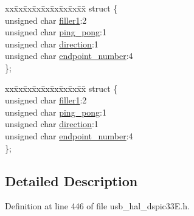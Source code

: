 \begin{DoxyCompactItemize}
\begin{tabbing}
\end{tabbing}\item 
\begin{tabbing}
xx\=xx\=xx\=xx\=xx\=xx\=xx\=xx\=xx\=\kill
struct \{\\
\>unsigned char \hyperlink{union_____u_s_t_a_t_a54acb45d462e0ff47705a7514916273d}{filler1}:2\\
\>unsigned char \hyperlink{union_____u_s_t_a_t_a9ec468b66f0444dc9be4ec11f75a0a5f}{ping\_pong}:1\\
\>unsigned char \hyperlink{union_____u_s_t_a_t_a4c9b82152ef06a9d3b78f60779cd4b85}{direction}:1\\
\>unsigned char \hyperlink{union_____u_s_t_a_t_a4f411fec039d172f03e2a41d46ff58ca}{endpoint\_number}:4\\
\}; \\

\end{tabbing}\item 
\begin{tabbing}
xx\=xx\=xx\=xx\=xx\=xx\=xx\=xx\=xx\=\kill
struct \{\\
\>unsigned char \hyperlink{union_____u_s_t_a_t_a54acb45d462e0ff47705a7514916273d}{filler1}:2\\
\>unsigned char \hyperlink{union_____u_s_t_a_t_a9ec468b66f0444dc9be4ec11f75a0a5f}{ping\_pong}:1\\
\>unsigned char \hyperlink{union_____u_s_t_a_t_a4c9b82152ef06a9d3b78f60779cd4b85}{direction}:1\\
\>unsigned char \hyperlink{union_____u_s_t_a_t_a4f411fec039d172f03e2a41d46ff58ca}{endpoint\_number}:4\\
\}; \\

\end{tabbing}\end{DoxyCompactItemize}


\subsection{Detailed Description}


Definition at line 446 of file usb\+\_\+hal\+\_\+dspic33\+E.\+h.



